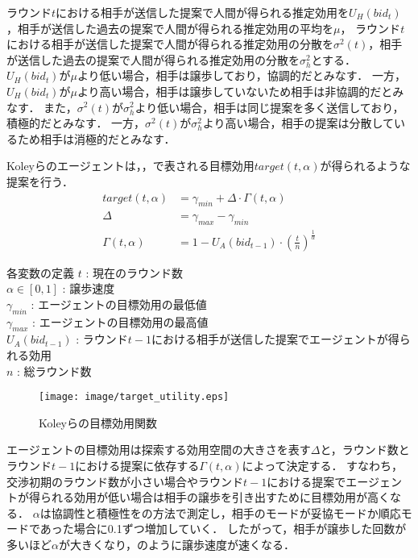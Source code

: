 ラウンド$t$における相手が送信した提案で人間が得られる推定効用を$U_H(bid_t)$，相手が送信した過去の提案で人間が得られる推定効用の平均を$\mu$，
ラウンド$t$における相手が送信した提案で人間が得られる推定効用の分散を$\sigma^2(t)$，相手が送信した過去の提案で人間が得られる推定効用の分散を$\sigma^2_h$とする．
$U_H(bid_t)$が$\mu$より低い場合，相手は譲歩しており，協調的だとみなす．
一方，$U_H(bid_t)$が$\mu$より高い場合，相手は譲歩していないため相手は非協調的だとみなす．
また，$\sigma^2(t)$が$\sigma^2_h$より低い場合，相手は同じ提案を多く送信しており，積極的だとみなす．
一方，$\sigma^2(t)$が$\sigma^2_h$より高い場合，相手の提案は分散しているため相手は消極的だとみなす．

Koleyらのエージェントは，，で表される目標効用$target(t,\alpha)$が得られるような提案を行う．
\begin{align}
    target(t,\alpha) &= \gamma_{min} + \Delta \cdot \Gamma(t,\alpha)  \label{eq:target}\\
    \Delta &= \gamma_{max} - \gamma_{min} \label{eq:delta} \\
    \Gamma(t,\alpha) &= 1 - U_A(bid_{t - 1}) \cdot \left( \frac{t}{n} \right)^{\frac{1}{\alpha}} \label{eq:gamma}
\end{align}

\begin{itembox}[l]{各変数の定義}
    $t$ : 現在のラウンド数 \\
    $\alpha \in [0,1]$ : 譲歩速度 \\
    $\gamma_{min}$ : エージェントの目標効用の最低値 \\
    $\gamma_{max}$ : エージェントの目標効用の最高値 \\
    $U_A(bid_{t - 1})$ : ラウンド$t - 1$における相手が送信した提案でエージェントが得られる効用 \\
    $n$ : 総ラウンド数
\end{itembox}

\begin{figure}[htb]
    \centering
    \texttt{[image: image/target\_utility.eps]}
    \caption{Koleyらの目標効用関数 \protect \footnotemark}
    \label{fig:koley_utility}
\end{figure}

エージェントの目標効用は探索する効用空間の大きさを表す$\Delta$と，ラウンド数とラウンド$t - 1$における提案に依存する$\Gamma(t,\alpha)$によって決定する．
すなわち，交渉初期のラウンド数が小さい場合やラウンド$t - 1$における提案でエージェントが得られる効用が低い場合は相手の譲歩を引き出すために目標効用が高くなる．
$\alpha$は協調性と積極性をの方法で測定し，相手のモードが妥協モードか順応モードであった場合に0.1ずつ増加していく．
したがって，相手が譲歩した回数が多いほど$\alpha$が大きくなり，のように譲歩速度が速くなる．

